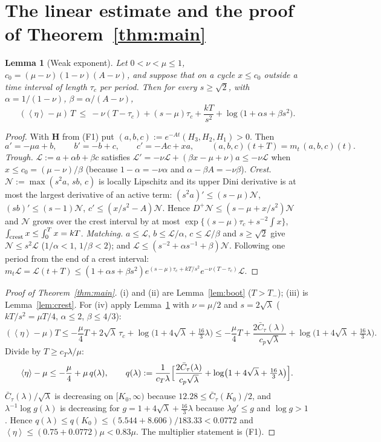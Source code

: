 \documentclass[11pt,a4paper]{article}
\newtheorem{lemma}[theorem]{Lemma}
\theoremstyle{remark}\newtheorem{remark}[theorem]{Remark}
\newcommand{\avg}[1]{\left\langle #1\right\rangle}
\begin{document}
\section{The linear estimate and the proof of Theorem~\ref{thm:main}}
\begin{lemma}[Weak exponent]\label{lem:lyap}
Let $0<\nu<\mu\le1$, $c_0=(\mu-\nu)(1-\nu)(A-\nu)$, and suppose that on a cycle $x\le c_0$ outside a time
interval of length $\tau_c$ per period. Then for every $s\ge\sqrt2$, with
$\alpha=1/(1-\nu)$, $\beta=\alpha/(A-\nu)$,
\[
(\avg\eta-\mu)\,T\ \le\ -\nu(T-\tau_c)+(s-\mu)\tau_c+\frac{kT}{s^2}+\log\bigl(1+\alpha s+\beta s^2\bigr).
\]
\end{lemma}
\begin{proof}
With $\mathbf H$ from (F1) put $(a,b,c):=e^{-At}(H_3,H_2,H_1)>0$. Then
\[
a'=-\mu a+b,\qquad b'=-b+c,\qquad c'=-Ac+xa,\qquad (a,b,c)(t+T)=m_t\,(a,b,c)(t).
\]
\emph{Trough.} $\mathcal L:=a+\alpha b+\beta c$ satisfies
$\mathcal L'=-\nu\mathcal L+(\beta x-\mu+\nu)a\le-\nu\mathcal L$ when $x\le c_0=(\mu-\nu)/\beta$
(because $1-\alpha=-\nu\alpha$ and $\alpha-\beta A=-\nu\beta$).
\emph{Crest.} $\mathcal N:=\max(s^2a,\,sb,\,c)$ is locally Lipschitz and its upper Dini derivative is
at most the largest derivative of an active term: $(s^2a)'\le(s-\mu)\mathcal N$,
$(sb)'\le(s-1)\mathcal N$, $c'\le(x/s^2-A)\mathcal N$. Hence
$D^+\mathcal N\le(s-\mu+x/s^2)\mathcal N$ and $\mathcal N$ grows over the crest interval by at most
$\exp\{(s-\mu)\tau_c+s^{-2}\!\int x\}$, $\int_{\rm crest}x\le\int_0^Tx=kT$.
\emph{Matching.} $a\le\mathcal L$, $b\le\mathcal L/\alpha$, $c\le\mathcal L/\beta$ and $s\ge\sqrt2$
give $\mathcal N\le s^2\mathcal L$ ($1/\alpha<1$, $1/\beta<2$); and
$\mathcal L\le(s^{-2}+\alpha s^{-1}+\beta)\mathcal N$. Following one period from the end of a crest
interval: $m_t\mathcal L=\mathcal L(t+T)\le(1+\alpha s+\beta s^2)e^{(s-\mu)\tau_c+kT/s^2}e^{-\nu(T-\tau_c)}\mathcal L$.
\end{proof}

\begin{proof}[Proof of Theorem~\ref{thm:main}]
(i) and (ii) are Lemma~\ref{lem:boot} ($T>T_-$); (iii) is Lemma~\ref{lem:crest}. For (iv) apply Lemma~\ref{lem:lyap} with $\nu=\mu/2$ and $s=2\sqrt\lambda$
($kT/s^2=\mu T/4$, $\alpha\le2$, $\beta\le4/3$):
\[
(\avg\eta-\mu)T\le-\frac\mu4T+2\sqrt\lambda\,\tau_c+\log\bigl(1+4\sqrt\lambda+\tfrac{16}3\lambda\bigr)
\le-\frac\mu4T+\frac{2\bar C_\tau(\lambda)}{c_p\sqrt\lambda}+\log\bigl(1+4\sqrt\lambda+\tfrac{16}3\lambda\bigr).
\]
Divide by $T\ge c_T\lambda/\mu$:
\[
\avg\eta-\mu\le-\frac\mu4+\mu\,q(\lambda),\qquad
q(\lambda):=\frac{1}{c_T\lambda}\Bigl[\frac{2\bar C_\tau(\lambda)}{c_p\sqrt\lambda}+\log\bigl(1+4\sqrt\lambda+\tfrac{16}3\lambda\bigr)\Bigr].
\]
$\bar C_\tau(\lambda)/\sqrt\lambda$ is decreasing on $[K_0,\infty)$ because $12.28\le\bar C_\tau(K_0)/2$, and
$\lambda^{-1}\log g(\lambda)$ is decreasing for $g=1+4\sqrt\lambda+\frac{16}3\lambda$ because
$\lambda g'\le g$ and $\log g>1$. Hence $q(\lambda)\le q(K_0)\le(5.544+8.606)/183.33<0.0772$ and
$\avg\eta\le(0.75+0.0772)\mu<0.83\mu$. The multiplier statement is (F1).
\end{proof}
\end{document}
